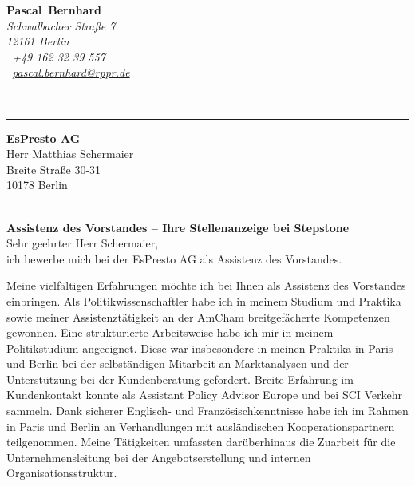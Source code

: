 \documentclass[11pt,a4paper]{article}
\def\firstname{Pascal}
\def\familyname{Bernhard}
\begin{document}
\sffamily   %
\hfill%
\begin{minipage}[t]{.6\textwidth}
	\raggedleft%
	{\bfseries {\color{firstnamecolor}\firstname}~{\color{familynamecolor}\familyname}}\\[.35ex]
	\small\itshape%
	Schwalbacher Straße 7\\
	12161 Berlin\\[.35ex]
	\Mobilefone~+49 162 32 39 557 \\
	\Letter~\href{mailto:pascal.bernhard@rppr.de}{pascal.bernhard@rppr.de}
\end{minipage}\\[0.5em]
%
{\color{firstnamecolor}\rule{\textwidth}{.25ex}}
%
\begin{minipage}[t]{.4\textwidth}
	\raggedright%
	\vspace*{1em}
	\textbf{EsPresto AG} \\
	Herr Matthias Schermaier \\[.35ex]
	\small%
	Breite Straße 30-31\\
	10178 Berlin
\end{minipage}
%
\hfill
%
\begin{minipage}[t]{.4\textwidth}
	\raggedleft %
\end{minipage}\\[1em]


{\bfseries \color{familynamecolor}Assistenz des Vorstandes -- Ihre Stellenanzeige bei Stepstone}\\[0.75em]

Sehr geehrter Herr Schermaier,\\[0.5em]
%
ich bewerbe mich bei der EsPresto AG als Assistenz des Vorstandes.

Meine vielfältigen Erfahrungen möchte ich bei Ihnen als Assistenz des Vorstandes einbringen. Als Politikwissenschaftler habe ich in meinem Studium und Praktika sowie meiner Assistenztätigkeit an der AmCham breitgefächerte Kompetenzen gewonnen. Eine strukturierte Arbeitsweise habe ich mir in meinem Politikstudium angeeignet. Diese war insbesondere in meinen Praktika in Paris und Berlin bei der selbständigen Mitarbeit an Marktanalysen und der Unterstützung bei der Kundenberatung gefordert. Breite Erfahrung im Kundenkontakt konnte als Assistant Policy Advisor Europe und bei SCI Verkehr sammeln. Dank sicherer Englisch- und Französischkenntnisse habe ich im Rahmen in Paris und Berlin an Verhandlungen mit ausländischen Kooperationspartnern teilgenommen. Meine Tätigkeiten umfassten darüberhinaus die Zuarbeit für die Unternehmensleitung bei der Angebotserstellung und internen Organisationsstruktur. 
\end{document}
